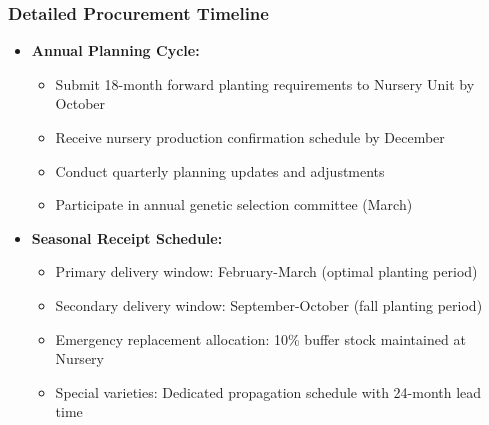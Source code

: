 \subsubsection{Detailed Procurement Timeline}
\begin{itemize}
    \item \textbf{Annual Planning Cycle:}
    \begin{itemize}
        \item Submit 18-month forward planting requirements to Nursery Unit by October
        \item Receive nursery production confirmation schedule by December
        \item Conduct quarterly planning updates and adjustments
        \item Participate in annual genetic selection committee (March)
    \end{itemize}
    \item \textbf{Seasonal Receipt Schedule:}
    \begin{itemize}
        \item Primary delivery window: February-March (optimal planting period)
        \item Secondary delivery window: September-October (fall planting period)
        \item Emergency replacement allocation: 10\% buffer stock maintained at Nursery
        \item Special varieties: Dedicated propagation schedule with 24-month lead time
    \end{itemize}
\end{itemize}

